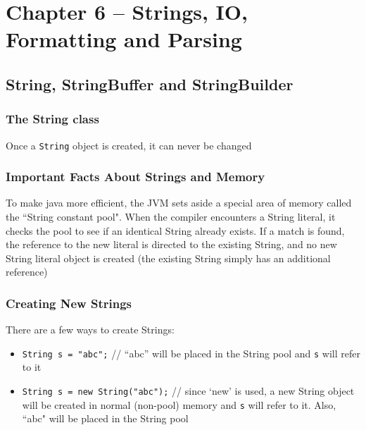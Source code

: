 \section{Chapter 6 -- Strings, IO, Formatting and Parsing}
\subsection{String, StringBuffer and StringBuilder}
\subsubsection{The String class}
Once a \verb#String# object is created, it can never be changed

\subsubsection{Important Facts About Strings and Memory}
To make java more efficient, the JVM sets aside a special area of memory called 
the ``String constant pool". When the compiler encounters a String literal, it 
checks the pool to see if an identical String already exists. If a match is 
found, the reference to the new literal is directed to the existing String, and 
no new String literal object is created (the existing String simply has an 
additional reference)

\subsubsection{Creating New Strings}
There are a few ways to create Strings:
\begin{itemize}
    \item \verb#String s = "abc";# // ``abc'' will be placed in the String pool 
    and \verb#s# will refer to it
    \item \verb#String s = new String("abc");# // since `new' is used, a new 
    String object will be created in normal (non-pool) memory and \verb#s# will 
    refer to it. Also, ``abc" will be placed in the String pool
\end{itemize}

